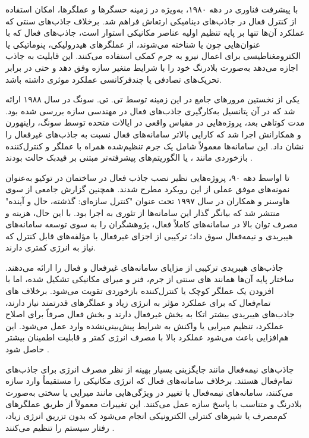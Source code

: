 با پیشرفت فناوری در دهه ۱۹۸۰، به‌ویژه در زمینه حسگرها و عملگرها، امکان استفاده از کنترل فعال در جاذب‌های دینامیکی ارتعاش فراهم شد. برخلاف جاذب‌های سنتی که عملکرد آن‌ها تنها بر پایه تنظیم اولیه عناصر مکانیکی استوار است، جاذب‌های فعال که با عنوان‌هایی چون  یا  شناخته می‌شوند، از عملگرهای هیدرولیکی، پنوماتیکی یا الکترومغناطیسی برای اعمال نیرو به جرم کمکی استفاده می‌کنند. این قابلیت به جاذب اجازه می‌دهد به‌صورت بلادرنگ خود را با شرایط متغیر سازه وفق دهد و حتی در برابر تحریک‌های تصادفی یا چندفرکانسی عملکرد موثری داشته باشد.

یکی از نخستین مرورهای جامع در این زمینه توسط تی. تی. سونگ در سال ۱۹۸۸ ارائه شد \cite{chang1980structural} که در آن پتانسیل به‌کارگیری جاذب‌های فعال در مهندسی سازه بررسی شده بود. مدت کوتاهی بعد، پروژه‌هایی در مقیاس واقعی در ایالات متحده توسط سونگ، راینهورن و همکارانش اجرا شد \cite{soong1991full} که کارایی بالاتر سامانه‌های فعال نسبت به جاذب‌های غیرفعال را نشان داد. این سامانه‌ها معمولاً شامل یک جرم تنظیم‌شده همراه با عملگر و کنترل‌کننده بازخوردی مانند ،  یا الگوریتم‌های پیشرفته‌تر مبتنی بر فیدبک حالت بودند \cite{yu2016active, ulusoy2021metaheuristic, casciati2012active, morales2015active}.

تا اواسط دهه ۹۰، پروژه‌هایی نظیر نصب جاذب فعال در ساختمان  در توکیو \cite{christenson2002semiactive} به‌عنوان نمونه‌های موفق عملی از این رویکرد مطرح شدند. همچنین گزارش جامعی از سوی هاوسنر و همکاران در سال ۱۹۹۷ تحت عنوان "کنترل سازه‌ای: گذشته، حال و آینده" منتشر شد \cite{housner1997structural} که بیانگر گذار این سامانه‌ها از تئوری به اجرا بود. با این حال، هزینه و مصرف توان بالا در سامانه‌های کاملاً فعال، پژوهشگران را به سوی توسعه سامانه‌های هیبریدی و نیمه‌فعال سوق داد؛ ترکیبی از اجزای غیرفعال با مؤلفه‌های قابل کنترل که نیاز به انرژی کمتری دارند.

جاذب‌های هیبریدی ترکیبی از مزایای سامانه‌های غیرفعال و فعال را ارائه می‌دهند. ساختار پایه آن‌ها همانند های سنتی از جرم، فنر و میرای مکانیکی تشکیل شده، اما با افزودن یک عملگر کوچک یا کنترل‌کننده بازخوردی تقویت می‌شود. برخلاف های تمام‌فعال که برای عملکرد مؤثر به انرژی زیاد و عملگرهای قدرتمند نیاز دارند، جاذب‌های هیبریدی بیشتر اتکا به بخش غیرفعال دارند و بخش فعال صرفاً برای اصلاح عملکرد، تنظیم میرایی یا واکنش به شرایط پیش‌بینی‌نشده وارد عمل می‌شود. این هم‌افزایی باعث می‌شود عملکرد بالا با مصرف انرژی کمتر و قابلیت اطمینان بیشتر حاصل شود \cite{chey2007passive, stanikzai2022recent, rahimi2020application, chesne2019innovative, el2013recent}.

جاذب‌های نیمه‌فعال مانند  جایگزینی بسیار بهینه از نظر مصرف انرژی برای جاذب‌های تمام‌فعال هستند. برخلاف سامانه‌های فعال که انرژی مکانیکی را مستقیماً وارد سازه می‌کنند، سامانه‌های نیمه‌فعال با تغییر در ویژگی‌هایی مانند میرایی یا سختی به‌صورت بلادرنگ و متناسب با پاسخ سازه عمل می‌کنند. این تغییرات معمولاً از طریق عملگرهای کم‌مصرف یا شیرهای کنترلی الکترونیکی انجام می‌شود که بدون تزریق انرژی زیاد، رفتار سیستم را تنظیم می‌کنند \cite{pastia2013vibration, kim2015control, yan2023seismic, demetriou2016novel, liedes2009improving}.

